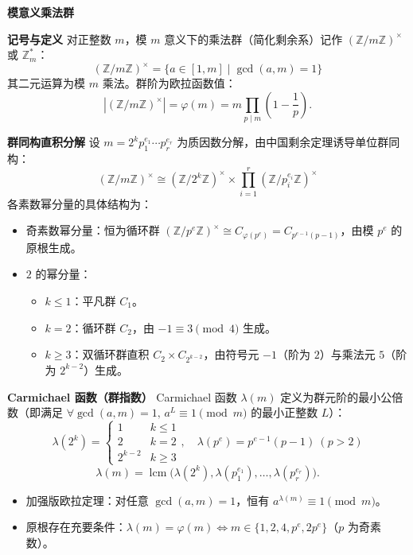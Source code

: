 \textbf{模意义乘法群}

\textbf{记号与定义}
对正整数 $m$，模 $m$ 意义下的乘法群（简化剩余系）记作 $(\mathbb{Z}/m\mathbb{Z})^\times$ 或 $\mathbb{Z}_m^*$：
\[
(\mathbb{Z}/m\mathbb{Z})^\times = \{a\in [1,m]\mid \gcd(a,m)=1\}
\]
其二元运算为模 $m$ 乘法。群阶为欧拉函数值：
\[
|(\mathbb{Z}/m\mathbb{Z})^\times| = \varphi(m) = m\prod_{p\mid m}\left(1-\frac{1}{p}\right).
\]

\textbf{群同构直积分解}
设 $m = 2^k p_1^{e_1}\cdots p_r^{e_r}$ 为质因数分解，由中国剩余定理诱导单位群同构：
\[
(\mathbb{Z}/m\mathbb{Z})^\times \cong (\mathbb{Z}/2^k\mathbb{Z})^\times \times \prod_{i=1}^r (\mathbb{Z}/p_i^{e_i}\mathbb{Z})^\times
\]
各素数幂分量的具体结构为：
\begin{itemize}
\item 奇素数幂分量：恒为循环群 $(\mathbb{Z}/p^e\mathbb{Z})^\times \cong C_{\varphi(p^e)} = C_{p^{e-1}(p-1)}$，由模 $p^e$ 的原根生成。
\item $2$ 的幂分量：
\begin{itemize}
\item $k \le 1$：平凡群 $C_1$。
\item $k = 2$：循环群 $C_2$，由 $-1\equiv 3\pmod 4$ 生成。
\item $k \ge 3$：双循环群直积 $C_2 \times C_{2^{k-2}}$，由符号元 $-1$（阶为 $2$）与乘法元 $5$（阶为 $2^{k-2}$）生成。
\end{itemize}
\end{itemize}

\textbf{Carmichael 函数（群指数）}
Carmichael 函数 $\lambda(m)$ 定义为群元阶的最小公倍数（即满足 $\forall \gcd(a,m)=1,\, a^L\equiv 1\pmod m$ 的最小正整数 $L$）：
\[
\lambda(2^k) = \begin{cases} 1 & k \le 1 \\ 2 & k = 2 \\ 2^{k-2} & k \ge 3 \end{cases}, \quad \lambda(p^e) = p^{e-1}(p-1)\ (p > 2)
\]
\[
\lambda(m) = \operatorname{lcm}\big(\lambda(2^k), \lambda(p_1^{e_1}), \dots, \lambda(p_r^{e_r})\big).
\]
\begin{itemize}
\item 加强版欧拉定理：对任意 $\gcd(a,m)=1$，恒有 $a^{\lambda(m)}\equiv 1\pmod m$。
\item 原根存在充要条件：$\lambda(m) = \varphi(m) \iff m \in \{1, 2, 4, p^e, 2p^e\}$（$p$ 为奇素数）。
\end{itemize}

